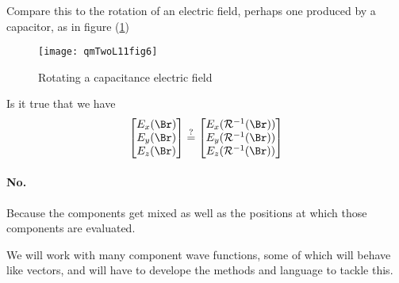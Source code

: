 Compare this to the rotation of an electric field, perhaps one produced by a capacitor, as in figure (\ref{fig:qmTwoL11:qmTwoL11fig6})

\begin{figure}[htp]
   \centering
   \texttt{[image: qmTwoL11fig6]}
   \caption{Rotating a capacitance electric field}\label{fig:qmTwoL11:qmTwoL11fig6}
\end{figure}

Is it true that we have
\begin{equation}\label{eqn:qmTwoL11:650}
\begin{bmatrix}
E_x(\Br) \\
E_y(\Br) \\
E_z(\Br) 
\end{bmatrix}
\stackrel{?}{=}
\begin{bmatrix}
E_x(\mathcal{R}^{-1}(\Br)) \\
E_y(\mathcal{R}^{-1}(\Br)) \\
E_z(\mathcal{R}^{-1}(\Br)) 
\end{bmatrix}
\end{equation}

\paragraph{No.}  Because the components get mixed as well as the positions at which those components are evaluated.

We will work with many component wave functions, some of which will behave like vectors, and will have to develope the methods and language to tackle this.

\EndArticle
